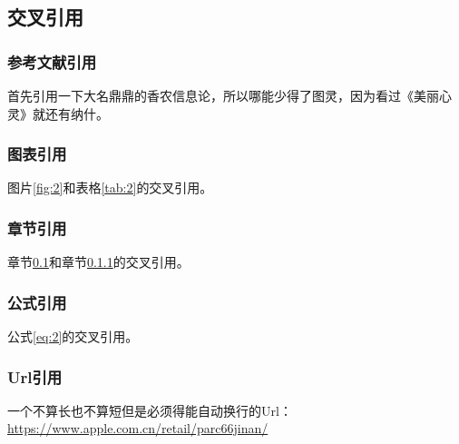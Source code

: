 \begin{ujnbody}
    \subsection{交叉引用}\label{sec:3}
    \subsubsection{参考文献引用}\label{sec:4}
    首先引用一下大名鼎鼎的香农信息论\cite{shannon1948mathematical}，所以哪能少得了图灵\cite{turing2009computing}，因为看过《美丽心灵》就还有纳什\cite{nash1996non}。
    \subsubsection{图表引用}
    图片\ref{fig:2}和表格\ref{tab:2}的交叉引用。
    \subsubsection{章节引用}
    章节\ref{sec:3}和章节\ref{sec:4}的交叉引用。
    \subsubsection{公式引用}
    公式\ref{eq:2}的交叉引用。
    \subsubsection{Url引用}
    一个不算长也不算短但是必须得能自动换行的Url：\url{https://www.apple.com.cn/retail/parc66jinan/}
\end{ujnbody}